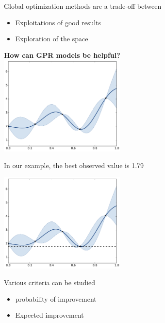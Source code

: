 \documentclass{beamer}
\begin{document}
\begin{frame}{}
Global optimization methods are a trade-off between 
\begin{itemize}
	\item Exploitations of good results
	\item Exploration of the space
\end{itemize}
\vspace{3mm}
\begin{center}
\textbf{How can GPR models be helpful?}\\
\includegraphics[height=5cm]{figures/python/ego_0}
\end{center}
\end{frame}

\begin{frame}{}
In our example, the best observed value is 1.79
\begin{center}
\includegraphics[height=5cm]{figures/python/ego_improv}
\end{center}
Various criteria can be studied
\begin{itemize}
	\item probability of improvement
	\item Expected improvement
\end{itemize}
\end{frame}
\end{document}
